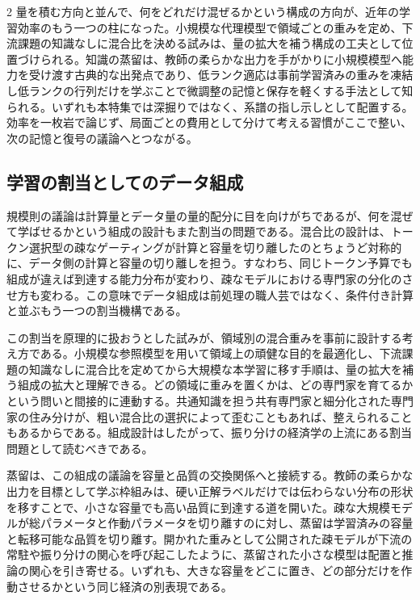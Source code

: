 \documentclass[lualatex,a4paper,10pt]{jlreq}
\begin{document}
\begin{multicols}{2}
量を積む方向と並んで、何をどれだけ混ぜるかという構成の方向が、近年の学習効率のもう一つの柱になった。小規模な代理模型で領域ごとの重みを定め、下流課題の知識なしに混合比を決める試みは、量の拡大を補う構成の工夫として位置づけられる\autocite{doremi}。知識の蒸留は、教師の柔らかな出力を手がかりに小規模模型へ能力を受け渡す古典的な出発点であり\autocite{hinton2015}、低ランク適応は事前学習済みの重みを凍結し低ランクの行列だけを学ぶことで微調整の記憶と保存を軽くする手法として知られる\autocite{lora}。いずれも本特集では深掘りではなく、系譜の指し示しとして配置する。効率を一枚岩で論じず、局面ごとの費用として分けて考える習慣がここで整い、次の記憶と復号の議論へとつながる。

\subsection{学習の割当としてのデータ組成}
規模則の議論は計算量とデータ量の量的配分に目を向けがちであるが、何を混ぜて学ばせるかという組成の設計もまた割当の問題である。混合比の設計は、トークン選択型の疎なゲーティングが計算と容量を切り離したのとちょうど対称的に\autocite{shazeer2017}、データ側の計算と容量の切り離しを担う。すなわち、同じトークン予算でも組成が違えば到達する能力分布が変わり、疎なモデルにおける専門家の分化のさせ方も変わる。この意味でデータ組成は前処理の職人芸ではなく、条件付き計算と並ぶもう一つの割当機構である。

この割当を原理的に扱おうとした試みが、領域別の混合重みを事前に設計する考え方である。小規模な参照模型を用いて領域上の頑健な目的を最適化し、下流課題の知識なしに混合比を定めてから大規模な本学習に移す手順は、量の拡大を補う組成の拡大と理解できる\autocite{doremi}。どの領域に重みを置くかは、どの専門家を育てるかという問いと間接的に連動する。共通知識を担う共有専門家と細分化された専門家の住み分けが、粗い混合比の選択によって歪むこともあれば、整えられることもあるからである\autocite{deepseekmoe}。組成設計はしたがって、振り分けの経済学の上流にある割当問題として読むべきである。

蒸留は、この組成の議論を容量と品質の交換関係へと接続する。教師の柔らかな出力を目標として学ぶ枠組みは、硬い正解ラベルだけでは伝わらない分布の形状を移すことで、小さな容量でも高い品質に到達する道を開いた\autocite{hinton2015}。疎な大規模モデルが総パラメータと作動パラメータを切り離すのに対し、蒸留は学習済みの容量と転移可能な品質を切り離す。開かれた重みとして公開された疎モデルが下流の常駐や振り分けの関心を呼び起こしたように\autocite{mixtral}、蒸留された小さな模型は配置と推論の関心を引き寄せる。いずれも、大きな容量をどこに置き、どの部分だけを作動させるかという同じ経済の別表現である。


\end{multicols}
\end{document}
